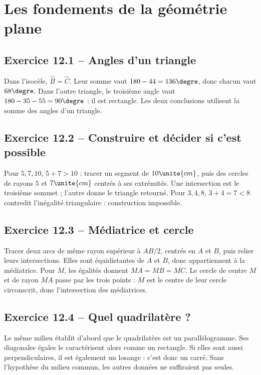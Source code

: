 \chapter{Les fondements de la géométrie plane}
\label{corriges:12}
\section*{Exercice 12.1 -- Angles d'un triangle}
Dans l'isocèle, $\widehat B=\widehat C$. Leur somme vaut $180-44=136\degre$, donc chacun vaut $68\degre$. Dans l'autre triangle, le troisième angle vaut $180-35-55=90\degre$ : il est rectangle. Les deux conclusions utilisent la somme des angles d'un triangle.

\section*{Exercice 12.2 -- Construire et décider si c'est possible}
Pour $5,7,10$, $5+7>10$ : tracer un segment de $10\unite{cm}$, puis des cercles de rayons $5$ et $7\unite{cm}$ centrés à ses extrémités. Une intersection est le troisième sommet ; l'autre donne le triangle retourné. Pour $3,4,8$, $3+4=7<8$ contredit l'inégalité triangulaire : construction impossible.

\section*{Exercice 12.3 -- Médiatrice et cercle}
Tracer deux arcs de même rayon supérieur à $AB/2$, centrés en $A$ et $B$, puis relier leurs intersections. Elles sont équidistantes de $A$ et $B$, donc appartiennent à la médiatrice.
Pour $M$, les égalités donnent $MA=MB=MC$. Le cercle de centre $M$ et de rayon $MA$ passe par les trois points : $M$ est le centre de leur cercle circonscrit, donc l'intersection des médiatrices.

\section*{Exercice 12.4 -- Quel quadrilatère ?}
Le même milieu établit d'abord que le quadrilatère est un parallélogramme. Ses diagonales égales le caractérisent alors comme un rectangle. Si elles sont aussi perpendiculaires, il est également un losange : c'est donc un carré. Sans l'hypothèse du milieu commun, les autres données ne suffiraient pas seules.
